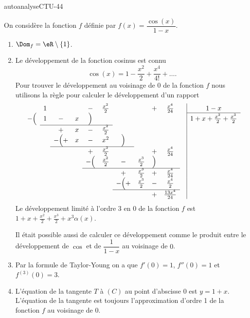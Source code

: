 
\begin{corrige}{autoanalyseCTU-44}



On considère la fonction $f$ définie par $f(x)=\dfrac{\cos (x)}{1-x}$.
\begin{enumerate}
\item $\Dom_f = \eR\setminus\{1\}$.
\item Le développement de la fonction cosinus est connu
  \begin{equation*}
    \cos(x) = 1-\frac{x^2}{2} + \frac{x^4}{4!} + \ldots.
  \end{equation*}
Pour trouver le développement au voisinage de $0$ de la fonction $f$ nous utilisons la règle pour calculer le développement d'un rapport
\begin{equation*}
        \begin{array}[]{ccccccccccc|c}
            &1&&&-&\frac{x^2}{ 2 }&&&+&\frac{x^4}{ 24 }& &1-x \\
            \cline{12-12}
            -\Big( &1&-&x&\Big)&&&& && &1+x+\frac{x^2}{2}+\frac{x^3}{2}\\
            \cline{2-6}
            & &+ &x&-&\frac{x^2}{ 2 }&&& & & &  \\
            &&-\Big( +&x&-&x^2&\Big)&& & & \\
            \cline{3-7}
            & & & & +&\frac{ x^2}{ 2 }&&&+&\frac{x^4}{ 24 }& &  \\
            & & &  &-\Big(  &\frac{ x^2 }{ 2 }&-&\frac{x^3}{ 2 }&\Big)& && \\
            \cline{5-10}
            & & & & & &+ &\frac{x^3}{2} &+&\frac{x^4}{ 24 } && \\
            & & & & & &- \Big( +&\frac{x^3}{2} &-&\frac{x^4}{ 2 } && \\
            \cline{7-10}
            & & & & & &&&+&\frac{13x^4}{ 24 } && \\
        \end{array}
    \end{equation*}
Le développement limité  à l'ordre 3 en 0 de la fonction $f$ est $\displaystyle 1+x+\frac{x^2}{2}+\frac{x^3}{2} + x^3\alpha(x)$.
\begin{remark}
  Il était possible aussi de calculer ce développement comme le produit entre le développement de $\cos$ et de $\dfrac{1}{1-x}$ au voisinage de $0$. 
\end{remark}
\item Par la formule de Taylor-Young on a que $f'(0) = 1$, $f''(0) = 1$ et $f^{(3)}(0) = 3$.
\item L'équation de la tangente  $T$ à $(C)$ au point d'abscisse 0 est $y = 1+x$. L'équation de la tangente est toujours l'approximation d'ordre 1 de la fonction $f$ au voisinage de $0$.


\end{enumerate}

\end{corrige}   

